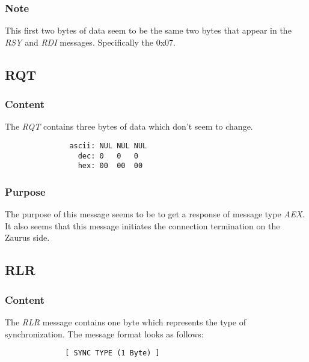             \subsubsection{Note}

            This first two bytes of data seem to be the same two
            bytes that appear in the \emph{RSY} and \emph{RDI}
            messages. Specifically the 0x07.

        \subsection{RQT}

            \subsubsection{Content}

            The \emph{RQT} contains three bytes of data which don't seem to
            change.

            \begin{verbatim}
               ascii: NUL NUL NUL
                 dec: 0   0   0
                 hex: 00  00  00
            \end{verbatim}
            
            \subsubsection{Purpose}

            The purpose of this message seems to be to get a response of
            message type \emph{AEX}. It also seems that this message initiates
            the connection termination on the Zaurus side.

        \subsection{RLR}

            \subsubsection{Content}

            The \emph{RLR} message contains one byte which represents the type
            of synchronization. The message format looks as follows:

            \begin{verbatim}
              [ SYNC TYPE (1 Byte) ]
            \end{verbatim}

